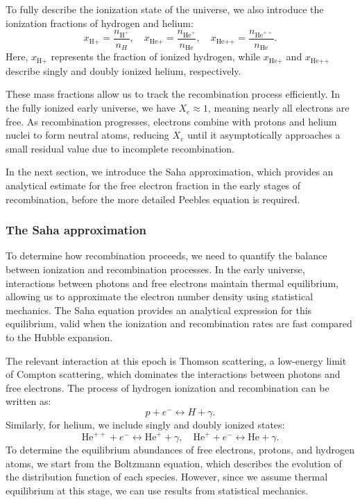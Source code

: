 \documentclass{aa}
\begin{document}
To fully describe the ionization state of the universe, we also introduce the ionization fractions of hydrogen and helium:
\begin{equation}
x_{\text{H+}} = \frac{n_{\text{H}^+}}{n_H}, \quad
x_{\text{He+}} = \frac{n_{\text{He}^+}}{n_{\text{He}}}, \quad
x_{\text{He++}} = \frac{n_{\text{He}^{++}}}{n_{\text{He}}}.
\end{equation}
Here, $x_{\text{H+}}$ represents the fraction of ionized hydrogen, while $x_{\text{He+}}$ and $x_{\text{He++}}$ describe singly and doubly ionized helium, respectively.

These mass fractions allow us to track the recombination process efficiently. In the fully ionized early universe, we have $X_e \approx 1$, meaning nearly all electrons are free. As recombination progresses, electrons combine with protons and helium nuclei to form neutral atoms, reducing $X_e$ until it asymptotically approaches a small residual value due to incomplete recombination.

In the next section, we introduce the Saha approximation, which provides an analytical estimate for the free electron fraction in the early stages of recombination, before the more detailed Peebles equation is required.
\color{black}







\subsubsection{The Saha approximation}
\color{Plum}
To determine how recombination proceeds, we need to quantify the balance between ionization and recombination processes. In the early universe, interactions between photons and free electrons maintain thermal equilibrium, allowing us to approximate the electron number density using statistical mechanics. The Saha equation provides an analytical expression for this equilibrium, valid when the ionization and recombination rates are fast compared to the Hubble expansion.

The relevant interaction at this epoch is Thomson scattering, a low-energy limit of Compton scattering, which dominates the interactions between photons and free electrons. The process of hydrogen ionization and recombination can be written as:
\begin{equation}
p + e^- \leftrightarrow H + \gamma.
\end{equation}
Similarly, for helium, we include singly and doubly ionized states:
\begin{equation}
\text{He}^{++} + e^- \leftrightarrow \text{He}^+ + \gamma, \quad
\text{He}^+ + e^- \leftrightarrow \text{He} + \gamma.
\end{equation}
To determine the equilibrium abundances of free electrons, protons, and hydrogen atoms, we start from the Boltzmann equation, which describes the evolution of the distribution function of each species. However, since we assume thermal equilibrium at this stage, we can use results from statistical mechanics.
\end{document}
